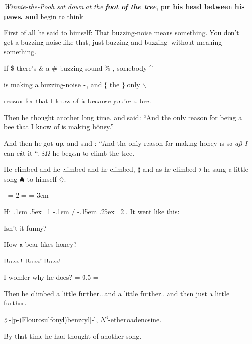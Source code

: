 {\it Winnie-the-Pooh sat down at the\/ {\bf foot of the tree}}, put {\bf his
head between his paws, and } begin to \/{\rm think.}

First of all he said {\sevenrm to himself: } That buzzing-noise means something.
You don't get a {\fiverm buzzing-noise like that, just buzzing and buzzing, without
meaning something. }

\medskip
\centerline{If \$ \quad there's \& \quad  a \# \quad buzzing-sound \% \quad, somebody \^ \quad
}
\centerline{
is making a buzzing-noise \~ \quad,  and $\{$ \quad the $\}$ \quad only $\backslash$
}
\centerline{
reason for that I know of is because you're a bee.
}
\medskip

\noindent Then he thought another long time, and said: ``And the only reason for
being a bee that I know of is making h\^oney.''

And then he got up, and said : ``And the only reason for making honey is so
{\it a\ss \/ I \/} can e\'at it ``. S$\Omega$ he beg$\alpha$n to climb the tree.

He climbed and he climbed and he climbed, $\sharp$ and as he climbed $\flat$ he
sang a little song $\spadesuit$ to himself $\diamondsuit$. 


\baselineskip = 2\baselineskip %
\parskip = \baselineskip       %
\parindent = 3em               %

\def\frac #1/#2{
\leavevmode
\kern.1em \raise .5ex \hbox{\the \scriptfont0 #1}
  \kern-.1em $/$
  \kern-.15em \lower .25ex \hbox{\the {} #2}
}

Hi \frac 1/2.
It went like this:

Isn't it funny?

How a bear likes honey?

Buzz ! Buzz! Buzz!

I wonder why he does?
\baselineskip = 0.5\baselineskip %
\parskip = \baselineskip       %



\footline{\hfil {\tenit - \folio -}\hfil }

Then he climbed a little further...and a little further.. and then just a little
further.

${\it 5}$-[p-(Flouro\-sul\-fonyl)ben\-zoyl]-l,
$N^6$-ethe\-no\-adeno\-sine.

By that time he had thought of another song. \medskip

